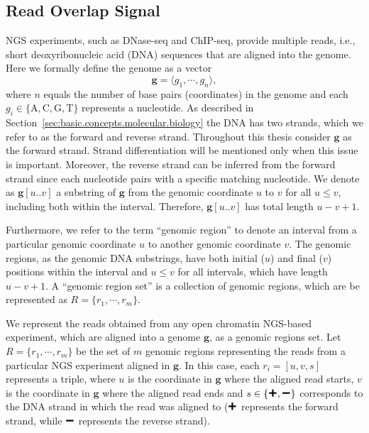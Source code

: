 \subsection{Read Overlap Signal}
\label{sec:read.overlap.signal}

NGS experiments, such as DNase-seq and ChIP-seq, provide multiple reads, i.e., short deoxyribonucleic acid (DNA) sequences that are aligned into the genome. Here we formally define the genome as a vector
\begin{equation}
  \label{eq:genome}
  \mathbf{g} = \langle {g}_{1}, \cdots, {g}_{n} \rangle,
\end{equation}
where $n$ equals the number of base pairs (coordinates) in the genome and each ${g}_{i} \in \{\text{A}, \text{C}, \text{G}, \text{T}\}$ represents a nucleotide. As described in Section~\ref{sec:basic.concepts.molecular.biology} the DNA has two strands, which we refer to as the forward and reverse strand. Throughout this thesis consider $\mathbf{g}$ as the forward strand. Strand differentiation will be mentioned only when this issue is important. Moreover, the reverse strand can be inferred from the forward strand since each nucleotide pairs with a specific matching nucleotide. We denote as $\mathbf{g}[u..v]$ a substring of $\mathbf{g}$ from the genomic coordinate $u$ to $v$ for all $u \leq v$, including both within the interval. Therefore, $\mathbf{g}[u..v]$ has total length $u-v+1$.

Furthermore, we refer to the term ``genomic region'' to denote an interval from a particular genomic coordinate $u$ to another genomic coordinate $v$. The genomic regions, as the genomic DNA substrings, have both initial ($u$) and final ($v$) positions within the interval and $u \leq v$ for all intervals, which have length $u-v+1$. A ``genomic region set'' is a collection of genomic regions, which are be represented as $R = \{ {r}_{1}, \cdots, {r}_{m} \}$.

We represent the reads obtained from any open chromatin NGS-based experiment, which are aligned into a genome $\mathbf{g}$, as a genomic regions set. Let $ R = \{ {r}_{1}, \cdots, {r}_{m} \}$ be the set of $m$ genomic regions representing the reads from a particular NGS experiment aligned in $\mathbf{g}$. In this case, each ${r}_{i} = [u, v, s]$ represents a triple, where $u$ is the coordinate in $\mathbf{g}$ where the aligned read starts, $v$ is the coordinate in $\mathbf{g}$ where the aligned read ends and $s \in \{\Plus, \Minus\}$ corresponds to the DNA strand in which the read was aligned to ($\Plus$ represents the forward strand, while $\Minus$ represents the reverse strand).

